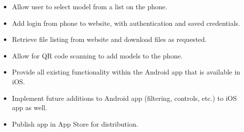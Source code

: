 \begin{enumerate}
\begin{itemize}
                \item Allow user to select model from a list on the phone.

                \item Add login from phone to website, with authentication and saved credentials.

                \item Retrieve file listing from website and download files as requested.

                \item Allow for QR code scanning to add models to the phone.

                \item Provide all existing functionality within the Android app that is available in iOS.

                \item Implement future additions to Android app (filtering, controls, etc.) to iOS app as well.

                \item Publish app in App Store for distribution.

            \end{itemize}
        \end{enumerate}